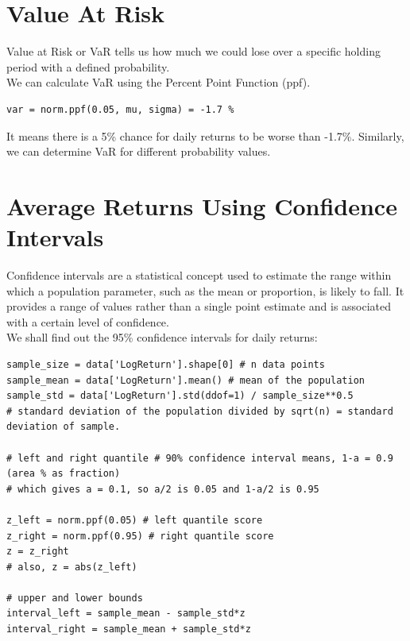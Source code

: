 \documentclass[11pt]{article}
\begin{document}
\section*{Value At Risk}
\vspace{5mm}
Value at Risk or VaR tells us how much we could lose over a specific holding period with a defined probability.\\
\vspace{2mm}
We can calculate VaR using the Percent Point Function (ppf).\\

\begin{verbatim}
var = norm.ppf(0.05, mu, sigma) = -1.7 %
\end{verbatim}
\vspace{1mm}

It means there is a 5\% chance for daily returns to be worse than -1.7\%. Similarly, we can determine VaR for different probability values.

\section*{Average Returns Using Confidence Intervals}
\vspace{5mm}
Confidence intervals are a statistical concept used to estimate the range within which a population parameter, such as the mean or proportion, is likely to fall. It provides a range of values rather than a single point estimate and is associated with a certain level of confidence.\\

We shall find out the 95\% confidence intervals for daily returns:
\begin{verbatim}
sample_size = data['LogReturn'].shape[0] # n data points
sample_mean = data['LogReturn'].mean() # mean of the population
sample_std = data['LogReturn'].std(ddof=1) / sample_size**0.5
# standard deviation of the population divided by sqrt(n) = standard deviation of sample.

# left and right quantile # 90% confidence interval means, 1-a = 0.9 (area % as fraction)
# which gives a = 0.1, so a/2 is 0.05 and 1-a/2 is 0.95

z_left = norm.ppf(0.05) # left quantile score
z_right = norm.ppf(0.95) # right quantile score
z = z_right
# also, z = abs(z_left)

# upper and lower bounds
interval_left = sample_mean - sample_std*z
interval_right = sample_mean + sample_std*z
\end{verbatim}
\end{document}
